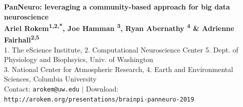 \documentclass[a0, landscape]{a0poster}
\begin{document}


\begin{minipage}[b]{0.80\linewidth}
\veryHuge \color{NavyBlue} \textbf{PanNeuro: leveraging a community-based approach for big data neuroscience} \color{Black}\\ %
\huge \textbf{Ariel Rokem\textsuperscript{1,2,*}, Joe Hamman \textsuperscript{3}, Ryan Abernathy \textsuperscript{4} \&  Adrienne Fairhall\textsuperscript{2,5}}\\ %
\Large 1. The eScience Institute, 2. Computational Neuroscience Center 5. Dept. of Physiology and Biophsyics, Univ. of Washington \\
3. National Center for Atmospheric Research, 4. Earth and Environmental Sciences, Columbia University \\%
\Large *Contact: \texttt{arokem@uw.edu} $|$ Download: \texttt{http://arokem.org/presentations/brainpi-panneuro-2019}
\end{minipage}
\end{document}
